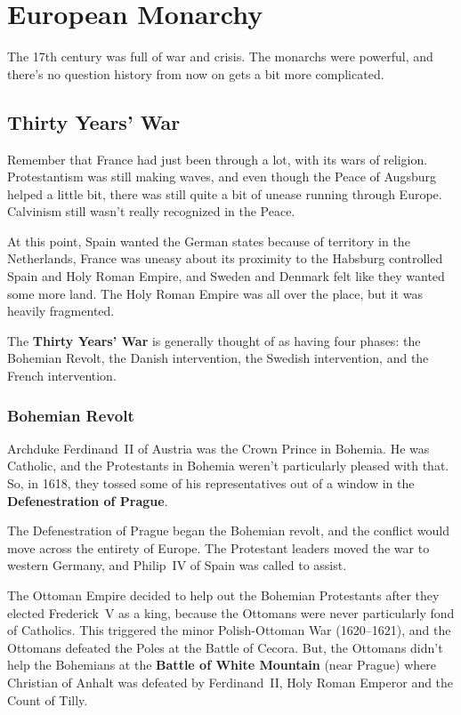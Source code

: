 \chapter{European Monarchy}

The 17th century was full of war and crisis.
The monarchs were powerful, and there's no question history from now on gets a bit more complicated.

\section{Thirty Years' War}

Remember that France had just been through a lot, with its wars of religion.
Protestantism was still making waves, and even though the Peace of Augsburg helped a little bit,
there was still quite a bit of unease running through Europe.
Calvinism still wasn't really recognized in the Peace.

At this point,
Spain wanted the German states because of territory in the Netherlands,
France was uneasy about its proximity to the Habsburg controlled Spain and Holy Roman Empire,
and Sweden and Denmark felt like they wanted some more land.
The Holy Roman Empire was all over the place, but it was heavily fragmented.

The \textbf{Thirty Years' War} is generally thought of as having four phases:
the Bohemian Revolt,
the Danish intervention,
the Swedish intervention,
and the French intervention.

\subsection*{Bohemian Revolt}

Archduke Ferdinand~II of Austria was the Crown Prince in Bohemia.
He was Catholic, and the Protestants in Bohemia weren't particularly pleased with that.
So, in 1618, they tossed some of his representatives out of a window in the \textbf{Defenestration of Prague}.

The Defenestration of Prague began the Bohemian revolt,
and the conflict would move across the entirety of Europe.
The Protestant leaders moved the war to western Germany,
and Philip~IV of Spain was called to assist.

The Ottoman Empire decided to help out the Bohemian Protestants after they elected Frederick~V as a king,
because the Ottomans were never particularly fond of Catholics.
This triggered the minor Polish-Ottoman War (1620--1621),
and the Ottomans defeated the Poles at the Battle of Cecora.
But, the Ottomans didn't help the Bohemians at the \textbf{Battle of White Mountain} (near Prague)
where Christian of Anhalt was defeated by Ferdinand~II, Holy Roman Emperor and the Count of Tilly.

